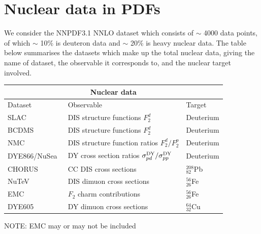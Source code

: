 \section{Nuclear data in PDFs}
\label{sec:nucdat}
We consider the NNPDF3.1 NNLO dataset which consists of $\sim$ 4000 data points, of which $\sim$ 10\% is deuteron data and $\sim$ 20\% is heavy nuclear data. The table below summarises the datasets which make up the total nuclear data, giving the name of dataset, the observable it corresponds to, and the nuclear target involved.
\begin{center}
\begin{tabular}{ |p{4cm}|p{7cm}|p{2cm}|  }
\hline
\multicolumn{3}{|c|}{Nuclear data} \\
\hline
Dataset & Observable & Target \\
\hline
\rowcolor{blue!20}
SLAC~\cite{Whitlow:1991uw}& DIS structure functions $F_2^d$ & Deuterium  \\
\rowcolor{blue!20}
BCDMS~\cite{Benvenuti:1989fm} & DIS structure functions $F_2^d$ & Deuterium \\
\rowcolor{blue!20}
NMC~\cite{Arneodo:1996kd} & DIS structure function ratios $F_2^d/F_2^p$ & Deuterium \\
\rowcolor{blue!20}
DYE866/NuSea~\cite{Towell:2001nh} & DY cross section ratios $\sigma^{\rm DY}_{pd}/\sigma^{\rm DY}_{pp}$ & Deuterium \\
\hline
\rowcolor{blue!40}
CHORUS~\cite{Onengut:2005kv} & CC DIS cross sections & $^{208}_{82}$Pb  \\
\rowcolor{blue!40}
NuTeV~\cite{Tzanov:2005kr} & DIS dimuon cross sections & $^{56}_{26}$Fe  \\
\rowcolor{blue!40}
EMC~\cite{EMC} & $F_2$ charm contributions & $^{56}_{26}$Fe  \\
\rowcolor{blue!40}
DYE605~\cite{Heinrich:1989cp} & DY dimuon cross sections & $^{64}_{32}$Cu  \\
\hline
\end{tabular}
\end{center}
NOTE: EMC may or may not be included
